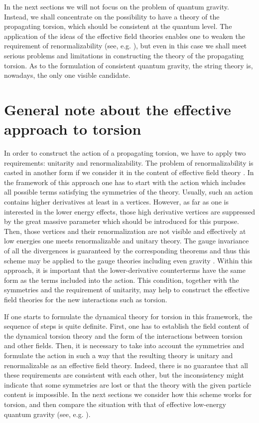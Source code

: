 In the next sections we will not focus on the problem of 
quantum gravity. Instead, we shall concentrate on the possibility
to have a theory of the propagating torsion, which should 
be consistent at the quantum level. The application of the ideas of the 
effective field theories enables one to weaken the requirement  
of renormalizability (see, e.g. \cite{weinberg,dogoho}), 
but even in this case
we shall meet serious problems and limitations in constructing
the theory of the propagating torsion. As to the formulation 
of consistent quantum gravity, the string theory is, nowadays,
the only one visible candidate. 

\section{General note about the effective approach to torsion}

In order to construct the action of a propagating torsion, 
we have to apply two requirements: unitarity and renormalizability.
The problem of renormalizability is casted in another form if we
consider it in the content of effective field theory 
\cite{weinberg,dogoho}.
In the framework of this approach one has to start with the action
which includes all possible terms satisfying the symmetries of the
theory. Usually, such an action contains higher derivatives at least in
a vertices. However, as far as one is interested in the lower
energy effects, those high derivative vertices are suppressed by the
great massive parameter which should be introduced for this purpose.
Then, those vertices and their renormalization are not visible and
effectively at low energies one meets renormalizable and unitary theory.
The gauge invariance of all the divergences is guaranteed by the
corresponding theorems \cite{volatyu} and thus this scheme may be
applied to the gauge theories including even gravity \cite{effgrav,don}.
Within this approach, it is important that the lower-derivative
counterterms have the same form as the terms included into
the action. This condition, together with the symmetries and the
requirement of unitarity, may help to construct the effective field
theories for the new interactions such as torsion.

If one starts to formulate the dynamical theory for torsion in this
framework, the sequence of steps is quite definite. First, one has
to establish the field content of the dynamical torsion theory and
the form of the interactions between torsion and other fields. 
Then, it is necessary to take into account the symmetries 
and formulate the action in such a way that the resulting theory
is unitary and renormalizable as an effective field theory.
Indeed, there is no guarantee that all these requirements are consistent
with each other, but the inconsistency might indicate that some
symmetries are lost or that the theory with the given
particle content is impossible. In the next sections we consider 
how this scheme works for torsion, and then compare the situation 
with that of effective low-energy quantum gravity 
(see, e.g. \cite{don}).

